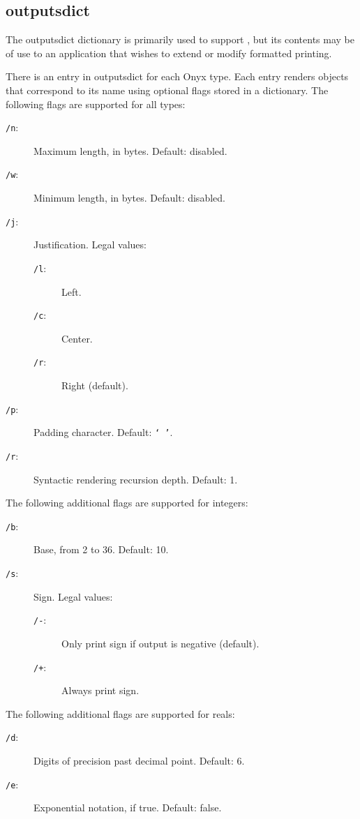 \subsection{outputsdict}
\label{sec:outputsdict}

The outputsdict dictionary is primarily used to support
, but its contents may be of
use to an application that wishes to extend or modify formatted printing.

There is an entry in outputsdict for each Onyx type.  Each entry renders objects
that correspond to its name using optional flags stored in a dictionary.  The
following flags are supported for all types:
\begin{description}
\item[{\tt /n}: ]
	Maximum length, in bytes.  Default: disabled.
\item[{\tt /w}: ]
	Minimum length, in bytes.  Default: disabled.
\item[{\tt /j}: ]
	Justification.  Legal values:
	\begin{description}
	\item[{\tt /l}: ]
		Left.
	\item[{\tt /c}: ]
		Center.
	\item[{\tt /r}: ]
		Right (default).
	\end{description}
\item[{\tt /p}: ]
	Padding character.  Default: {\tt ` '}.
\item[{\tt /r}: ]
	Syntactic rendering recursion depth.  Default: 1.
\end{description}

The following additional flags are supported for integers:
\begin{description}
\item[{\tt /b}: ]
	Base, from 2 to 36.  Default: 10.
\item[{\tt /s}: ]
	Sign.  Legal values:
	\begin{description}
	\item[{\tt /-}: ]
		Only print sign if output is negative (default).
	\item[{\tt /+}: ]
		Always print sign.
	\end{description}
\end{description}

The following additional flags are supported for reals:
\begin{description}
\item[{\tt /d}: ]
	Digits of precision past decimal point.  Default: 6.
\item[{\tt /e}: ]
	Exponential notation, if true.  Default: false.
\end{description}

